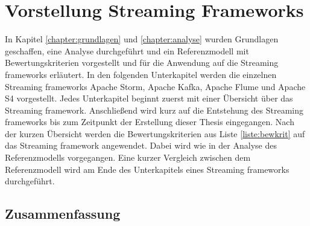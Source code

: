 \chapter{Vorstellung Streaming Frameworks}
\label{chapter:vorstellung}

In Kapitel \ref{chapter:grundlagen} und \ref{chapter:analyse} wurden Grundlagen geschaffen, eine Analyse durchgeführt und ein Referenzmodell mit Bewertungskriterien vorgestellt und für die Anwendung auf die Streaming frameworks erläutert. In den folgenden Unterkapitel werden die einzelnen Streaming frameworks Apache Storm, Apache Kafka, Apache Flume und Apache S4 vorgestellt. Jedes Unterkapitel beginnt zuerst mit einer Übersicht über das Streaming framework. Anschließend wird kurz auf die Entstehung des Streaming frameworks bis zum Zeitpunkt der Erstellung dieser Thesis eingegangen. Nach der kurzen Übersicht werden die Bewertungskriterien aus Liste \ref{liste:bewkrit} auf das Streaming framework angewendet. Dabei wird wie in der Analyse des Referenzmodells vorgegangen. Eine kurzer Vergleich zwischen dem Referenzmodell wird am Ende des Unterkapitels eines Streaming frameworks durchgeführt.









\section{Zusammenfassung}